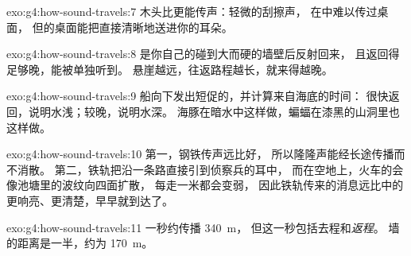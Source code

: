 \begin{solution}{exo:g4:how-sound-travels:7}
木头比更能传声：轻微的刮擦声，
在中难以传过桌面，
但的桌面能把直接清晰地送进你的耳朵。
\end{solution}

\begin{solution}{exo:g4:how-sound-travels:8}
是你自己的碰到大而硬的墙壁后反射回来，
且返回得足够晚，能被单独听到。
悬崖越远，往返路程越长，就来得越晚。
\end{solution}

\begin{solution}{exo:g4:how-sound-travels:9}
船向下发出短促的，并计算来自海底的时间：
很快返回，说明水浅；较晚，说明水深。
海豚在暗水中这样做，蝙蝠在漆黑的山洞里也这样做。
\end{solution}

\begin{solution}{exo:g4:how-sound-travels:10}
第一，钢铁传声远比好，
所以隆隆声能经长途传播而不消散。
第二，铁轨把沿一条路直接引到侦察兵的耳中，
而在空地上，火车的会像池塘里的波纹向四面扩散，
每走一米都会变弱，
因此铁轨传来的消息远比中的更响亮、更清楚，早早就到达了。
\end{solution}

\begin{solution}{exo:g4:how-sound-travels:11}
一秒约传播 \qty{340}{m}，
但这一秒包括去程和\emph{返程}。
墙的距离是一半，约为 \qty{170}{m}。
\end{solution}
